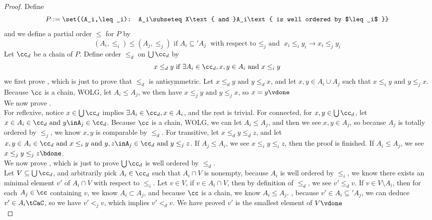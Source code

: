 \documentclass{report}
\begin{document}
\begin{proof}
Define
\begin{equation*}
P:=\set{(A_i,\leq_i): A_i\subseteq X\text{ and }A_i\text{ is well ordered by $\leq_i$ }}
\end{equation*}
and we define a partial order $\leq $ for $P$ by
\begin{equation*}
  (A_i,\leq_i)\leq (A_j,\leq _j)\text{ if }A_i\subseteq' A_j\text{ with respect to $\leq_j$ and }x_i\leq_i y_i\longrightarrow x_i\leq_j y_i 
\end{equation*}
Let $\cc_d$ be a chain of $P$. Define order $\leq_d$ on $\bigcup \cc_d$ by
\begin{equation*}
x\leq_d y\text{ if }\exists A_i\in\cc_d, x,y\in A_i\text{ and }x\leq_i y
\end{equation*}
we first prove , which is just to prove that $\leq_d$ is antisymmetric. Let $x\leq_d y\text{ and }y\leq _dx$, and let $x,y\in A_i\cup A_j$ such that $x\leq_i y\text{ and }y\leq _jx$. Because $\cc$ is a chain, WOLG, let $A_i\leq A_j$, we then have  $x\leq_j y\text{ and }y\leq _jx$, so $x=y\vdone$\\

We now prove  .\\

For reflexive, notice $x\in \bigcup\cc_d$ implies $\exists A_i\in\cc_d, x \in A_i$, and the rest is trivial. For connected, for $x,y\in \bigcup \cc_d$, let $x\in A_i \in\cc_d\text{ and }y\inA_j\in\cc_d$. Because $\cc$ is a chain, WOLG, we can let $A_i\leq A_j$, and then we see $x,y\in A_j$, so because $A_j$ is totally ordered by $\leq_j$, we know $x,y$ is comparable by  $\leq_d$. For transitive, let $x\leq_d y\leq _d z$, and let $x,y\in A_i\in\cc_d\text{ and }x\leq _iy\text{ and }y,z\inA_j\in\cc_d\text{ and }y\leq _jz$. If $A_j\leq A_i$, we see $x\leq_i y\leq_i z$, then the proof is finished. If $A_i\leq A_j$, we see $x\leq_j y\leq_j z\bdone$.\\

We now prove , which is just to prove $\bigcup \cc_d$ is well ordered by $\leq_d$.\\

Let $V\subseteq \bigcup \cc_d$, and arbitrarily pick $A_i\in \cc_d$ such that $A_i\cap V$ is nonempty, because $A_i$ is well ordered by  $\leq _i$, we know there exists an minimal element $v'$ of $A_i\cap V$ with respect to $\leq _i$. Let $v \in V$, if $v\in A_i\cap V$, then by definition of $\leq _d$, we see $v'\leq_d v$. If $v\in V\setminus A_i$, then for each $A_j\in\cc$ containing $v$, we know $A_i\subset A_j$, and because $\cc$ is a chain, we know $A_i\leq A_j$. , because $v'\in A_i\subseteq' A_j$, we can deduce $v'\in A_i\tCaC$, so we have $v'<_j v$, which implies $v' <_d v$. We have proved $v'$ is the smallest element of $V\vdone$ \\


\end{proof}
\end{document}
